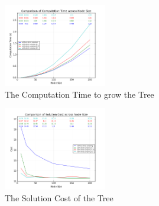 \documentclass[conference]{IEEEtran}
\begin{document}
\begin{figure}[ht!]
	\centering
	\includegraphics[width=0.4\textwidth]{assets/time_plot}
	\caption{The Computation Time to grow the Tree}
	\label{plot_compare_all:time}
\end{figure}
\begin{figure}[ht!]
	\centering
	\includegraphics[width=0.4\textwidth]{assets/cost_plot}
	\caption{The Solution Cost of the Tree}
	\label{plot_compare_all:cost}
\end{figure}
\end{document}
